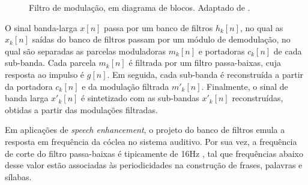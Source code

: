 \begin{figure}[h]
    \centering
    \caption{Filtro de modulação, em diagrama de blocos. Adaptado de \cite{li2005properties}.}
\end{figure}

O sinal banda-larga $x[n]$ passa por um banco de filtros $h_k[n]$, no qual as  $x_k[n]$
saídas do banco de filtros passam por um módulo de demodulação, no qual são
separadas as parcelas moduladoras $m_k[n]$ e portadoras $c_k[n]$ de cada
sub-banda. Cada parcela $m_k[n]$ é filtrada por um filtro passa-baixas, cuja
resposta ao impulso é $g[n]$. Em seguida, cada sub-banda é reconstruída a partir da portadora
$c_k[n]$ e da modulação filtrada $m'_k[n]$. Finalmente, o sinal de banda larga
$x'_k[n]$ é sintetizado com as sub-bandas $x'_k[n]$ reconstruídas, obtidas a
partir das modulações filtradas.

Em aplicações de \textit{speech enhancement}, o projeto do banco de filtros
emula a resposta em frequência da cóclea no sistema auditivo. Por sua vez, a
frequência de corte do filtro passa-baixas é tipicamente de 16Hz
\cite{drullman1994}, tal que frequências abaixo desse valor estão associadas às
periodicidades na construção de frases, palavras e sílabas.

